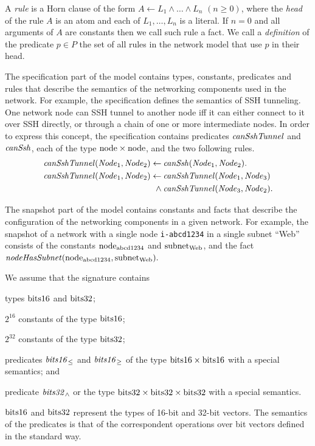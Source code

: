 A \emph{rule} is a Horn clause of the form $A\leftarrow L_1 \wedge \ldots \wedge L_n$ $(n \ge 0)$, where the \emph{head} of the rule $A$ is an atom and each of $L_1,\ldots,L_n$ is a literal. If $n=0$ and all arguments of $A$ are constants then we call such rule a fact. We call a \emph{definition} of the predicate $p \in P$ the set of all rules in the network model that use $p$ in their head.

The specification part of the model contains types, constants, predicates and rules that describe the semantics of the networking components used in the network. For example, the specification defines the semantics of SSH tunneling. One network node can SSH tunnel to another node iff it can either connect to it over SSH directly, or through a chain of one or more intermediate nodes. In order to express this concept, the specification contains predicates $\mathit{canSshTunnel}$ and $\mathit{canSsh}$, each of the type $\mathrm{node}\times\mathrm{node}$, and the two following rules.
\begin{align*}
\mathit{canSshTunnel}(\mathit{Node}_1,\mathit{Node}_2)\leftarrow\:&\mathit{canSsh}(\mathit{Node}_1,\mathit{Node}_2). \\
\mathit{canSshTunnel}(\mathit{Node}_1,\mathit{Node}_2)\leftarrow\:&\mathit{canSshTunnel}(\mathit{Node}_1,\mathit{Node}_3)\\
\wedge\:&\mathit{canSshTunnel}(\mathit{Node}_3,\mathit{Node}_2).
\end{align*}

The snapshot part of the model contains constants and facts that describe the configuration of the networking components in a given network. For example, the snapshot of a network with a single node \verb'i-abcd1234' in a single subnet ``Web'' consists of the constants $\mathrm{node}_\text{abcd1234}$ and $\mathrm{subnet}_\text{Web}$, and the fact $\mathit{nodeHasSubnet}(\mathrm{node}_\text{abcd1234},\mathrm{subnet}_\text{Web}).$

We assume that the signature contains
\begin{enumerate*}[label=(\roman*)]
  \item types $\mathrm{bits16}$ and $\mathrm{bits32}$;
  \item $2^{16}$ constants of the type $\mathrm{bits16}$;
  \item $2^{32}$ constants of the type $\mathrm{bits32}$;
  \item predicates $\mathit{bits16}_{\le}$ and $\mathit{bits16}_{\ge}$ of the type $\mathrm{bits16} \times \mathrm{bits16}$ with a special semantics; and
  \item predicate $\mathit{bits32}_\wedge$ or the type $\mathrm{bits32}\times\mathrm{bits32}\times\mathrm{bits32}$ with a special semantics.
\end{enumerate*}
$\mathrm{bits16}$ and $\mathrm{bits32}$ represent the types of 16-bit and 32-bit vectors. The semantics of the predicates is that of the correspondent operations over bit vectors defined in the standard way.

